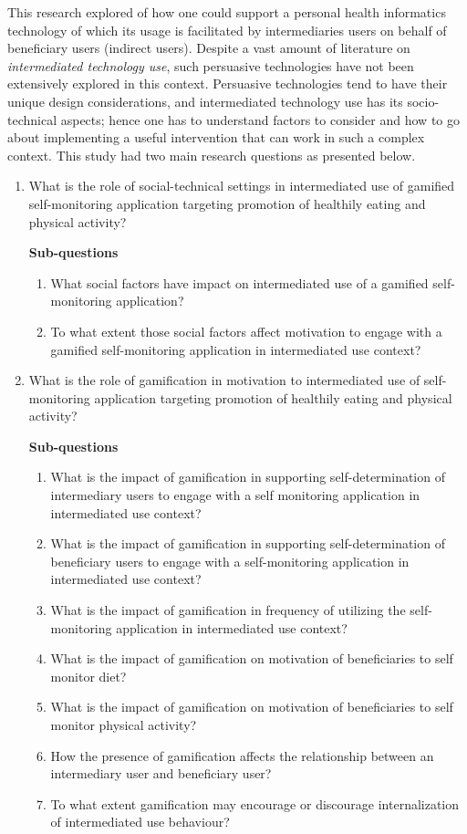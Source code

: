 This research explored of how one could support a personal health informatics technology of which its usage is facilitated by intermediaries users on behalf of beneficiary users (indirect users). Despite a vast amount of literature on \emph{intermediated technology use}, such persuasive technologies have not been extensively explored in this context. Persuasive technologies tend to have their unique design considerations, and intermediated technology use has its socio-technical aspects; hence one has to understand factors to consider and how to go about implementing a useful intervention that can work in such a complex context. This study had two main research questions as presented below.
\begin{enumerate}
\item What is the role of social-technical settings in intermediated use of gamified self-monitoring application targeting promotion of healthily eating and physical activity?

\textbf{Sub-questions}
\begin{enumerate}[label=\alph*.]
\item What social factors have impact on intermediated use of a gamified self-monitoring application?
\item To what extent those social factors affect motivation to engage with a gamified self-monitoring application in intermediated use context?
\end{enumerate}
\item What is the role of gamification in motivation to intermediated use of self-monitoring application targeting promotion of healthily eating and physical activity?

\textbf{Sub-questions}
\begin{enumerate}[label=\alph*.]
\item What is the impact of gamification in supporting self-determination of intermediary users to engage with a self monitoring application in intermediated use context?
\item What is the impact of gamification in supporting self-determination of beneficiary users to engage with a self-monitoring application in intermediated use context?
\item What is the impact of gamification in frequency of utilizing the self-monitoring application in intermediated use context?
\item What is the impact of gamification on motivation of beneficiaries to self monitor diet?
\item What is the impact of gamification on motivation of beneficiaries to self monitor physical activity?
\item How the presence of gamification affects the relationship between an intermediary user and beneficiary user?
\item To what extent gamification may encourage or discourage internalization of intermediated use behaviour?
\end{enumerate}
\end{enumerate}  
